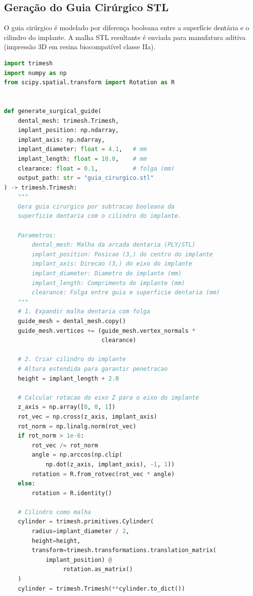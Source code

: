 \subsection{Geração do Guia Cirúrgico STL}
\label{subsec:guia-cirurgico}

O guia cirúrgico é modelado por diferença booleana entre a superfície dentária e o cilindro do implante. A malha STL resultante é enviada para manufatura aditiva (impressão 3D em resina biocompatível classe IIa).

\begin{lstlisting}[language=Python, caption=Geracao de guia cirurgico por operacao booleana com trimesh, label=code:guia-cirurgico]
import trimesh
import numpy as np
from scipy.spatial.transform import Rotation as R


def generate_surgical_guide(
    dental_mesh: trimesh.Trimesh,
    implant_position: np.ndarray,
    implant_axis: np.ndarray,
    implant_diameter: float = 4.1,   # mm
    implant_length: float = 10.0,    # mm
    clearance: float = 0.1,          # folga (mm)
    output_path: str = "guia_cirurgico.stl"
) -> trimesh.Trimesh:
    """
    Gera guia cirurgico por subtracao booleana da
    superficie dentaria com o cilindro do implante.

    Parametros:
        dental_mesh: Malha da arcada dentaria (PLY/STL)
        implant_position: Posicao (3,) do centro do implante
        implant_axis: Direcao (3,) do eixo do implante
        implant_diameter: Diametro do implante (mm)
        implant_length: Comprimento do implante (mm)
        clearance: Folga entre guia e superficie dentaria (mm)
    """
    # 1. Expandir malha dentaria com folga
    guide_mesh = dental_mesh.copy()
    guide_mesh.vertices += (guide_mesh.vertex_normals *
                            clearance)

    # 2. Criar cilindro do implante
    # Altura estendida para garantir penetracao
    height = implant_length + 2.0

    # Calcular rotacao do eixo Z para o eixo do implante
    z_axis = np.array([0, 0, 1])
    rot_vec = np.cross(z_axis, implant_axis)
    rot_norm = np.linalg.norm(rot_vec)
    if rot_norm > 1e-6:
        rot_vec /= rot_norm
        angle = np.arccos(np.clip(
            np.dot(z_axis, implant_axis), -1, 1))
        rotation = R.from_rotvec(rot_vec * angle)
    else:
        rotation = R.identity()

    # Cilindro como malha
    cylinder = trimesh.primitives.Cylinder(
        radius=implant_diameter / 2,
        height=height,
        transform=trimesh.transformations.translation_matrix(
            implant_position) @
                 rotation.as_matrix()
    )
    cylinder = trimesh.Trimesh(**cylinder.to_dict())


\end{lstlisting}
